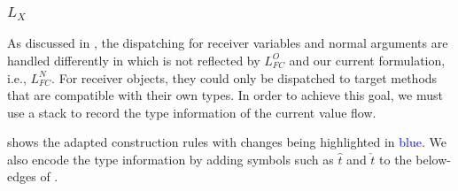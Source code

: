 \subsubsection{$L_X$}
\label{subsubsec:newLX}

As discussed in , the dispatching for receiver variables and normal arguments are handled differently in  which is not reflected by $L_{FC}^{O}$ and our current formulation, i.e., $L_{FC}^{N}$. For receiver objects, they could only be dispatched to target methods that are compatible with their own types. In order to achieve this goal, we must use a stack to record the type information of the current value flow. 

 shows the adapted \pag construction rules with changes being highlighted in \textcolor{blue}{blue}. We also encode the type information by adding symbols such as $\hat{\boxed{t}}$ and  $\check{\boxed{t}}$ to the below-edges of \pag. 

